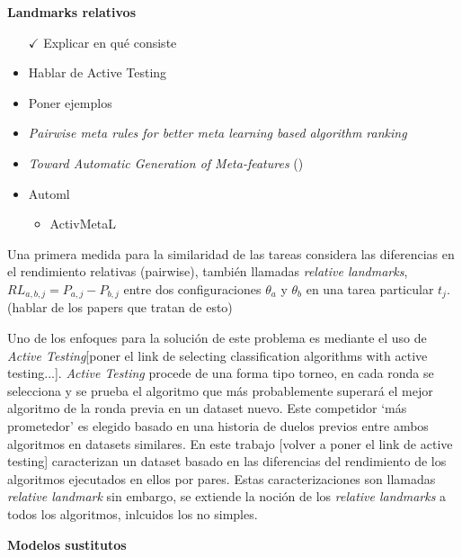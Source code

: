 \quad 

\textbf{Landmarks relativos}

\begin{itemize}
	\item[$\checkmark$] Explicar en qué consiste
	\item Hablar de Active Testing
	\item Poner ejemplos
	\item \textit{Pairwise meta rules for better meta learning based algorithm ranking}
	\item \textit{Toward Automatic Generation of Meta-features} (\cite{pinto2016towards})
	\item Automl \begin{itemize}
		\item ActivMetaL \cite{activmetal}
	\end{itemize}
\end{itemize}

\quad

Una primera medida para la similaridad de las tareas considera las diferencias en el rendimiento relativas (pairwise), también llamadas \textit{relative landmarks}, $RL_{a,b,j} = P_{a,j} - P_{b,j}$ entre dos configuraciones $\theta_a$ y $\theta_b$ en una tarea particular $t_j$. (hablar de los papers que tratan de esto) 

Uno de los enfoques para la solución de este problema es mediante el uso de \textit{Active Testing}[poner el link de selecting classification algorithms with active testing...]. \textit{Active Testing} procede de una forma tipo torneo, en cada ronda se selecciona y se prueba el algoritmo que más probablemente superará el mejor algoritmo de la ronda previa en un dataset nuevo. Este competidor `más prometedor' es elegido basado en una historia de duelos previos entre ambos algoritmos en datasets similares. En este trabajo [volver a poner el link de active testing] caracterizan un dataset basado en las diferencias del rendimiento de los algoritmos ejecutados en ellos por pares. Estas caracterizaciones son llamadas \textit{relative landmark} sin embargo, se extiende la noción de los \textit{relative landmarks} a todos los algoritmos, inlcuidos los no simples.

\quad

\textbf{Modelos sustitutos}

